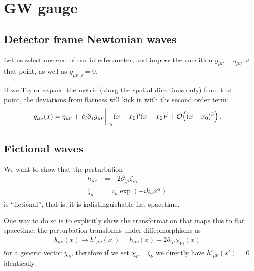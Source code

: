 \documentclass[main.tex]{subfiles}
\begin{document}
\section{GW gauge}

\subsection{Detector frame Newtonian waves}

Let us select one end of our interferometer, and impose the condition \(g_{\mu \nu } = \eta_{\mu \nu }\) at that point, as well as \(g_{\mu \nu , \rho } = 0\). 

If we Taylor expand the metric (along the spatial directions only) from that point,
the deviations from flatness will kick in with the second order term: 
%
\begin{align}
g_{\mu \nu } (x) = \eta_{\mu \nu } + \eval{\partial_{i} \partial_{j} g_{\mu \nu }}_{x_0 } 
(x-x_0 )^{i}
(x-x_0 )^{j} + \order{(x-x_0 )^3}
\,.
\end{align}
%


\subsection{Fictional waves}

We want to show that the perturbation 
%
\begin{align}
h_{\mu \nu } &= - 2 \partial_{(\mu } \zeta_{\nu )}  \\
\zeta_{\mu } &= c_\mu \exp( - i k_\alpha x^{\alpha })
\,
\end{align}
%
is ``fictional'', that is, it is indistinguishable flat spacetime.

One way to do so is to explicitly show the transformation that maps this to flat spacetime: the perturbation transforms under diffeomorphisms as 
%
\begin{align}
h_{\mu \nu } (x) \to h'_{\mu \nu } (x') = h_{\mu \nu } (x) + 2 \partial_{(\mu } \chi_{\nu )} (x)
\,
\end{align}
%
for a generic vector \(\chi_{\nu }\), therefore if we set \(\chi _\nu = \zeta _\nu \) we directly have \(h'_{\mu \nu } (x') = 0\) identically.
\end{document}
